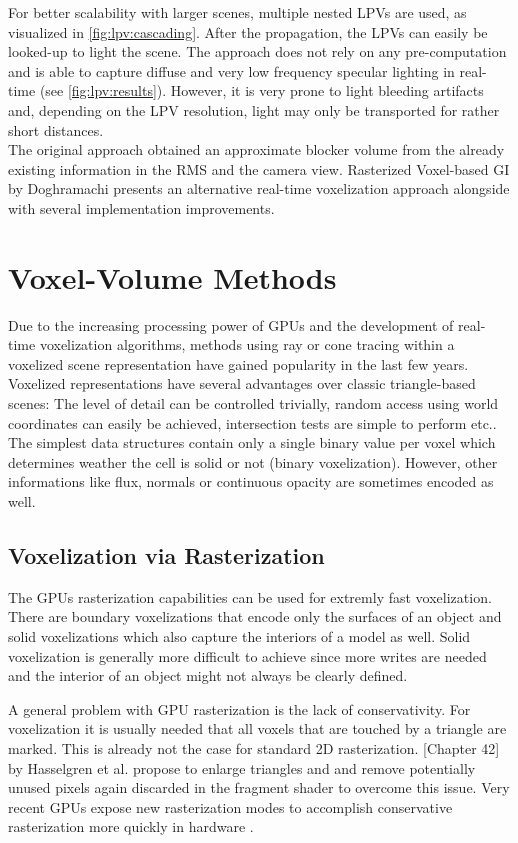 \documentclass[thesis.tex]{subfiles}
\begin{document}
For better scalability with larger scenes, multiple nested LPVs are used, as visualized in \autoref{fig:lpv:cascading}.
After the propagation, the LPVs can easily be looked-up to light the scene.
The approach does not rely on any pre-computation and is able to capture diffuse and very low frequency specular lighting in real-time (see \autoref{fig:lpv:results}).
However, it is very prone to light bleeding artifacts and, depending on the LPV resolution, light may only be transported for rather short distances.
\\
The original approach obtained an approximate blocker volume from the already existing information in the RMS and the camera view.
Rasterized Voxel-based GI by Doghramachi \cite{bib:rasterizedvbgi} presents an alternative real-time voxelization approach alongside with several implementation improvements.

\section{Voxel-Volume Methods} \label{sec:prev:voxelmethods}
Due to the increasing processing power of GPUs and the development of real-time voxelization algorithms, methods using ray or cone tracing within a voxelized scene representation have gained popularity in the last few years.
Voxelized representations have several advantages over classic triangle-based scenes:
The level of detail can be controlled trivially, random access using world coordinates can easily be achieved, intersection tests are simple to perform etc..
The simplest data structures contain only a single binary value per voxel which determines weather the cell is solid or not (binary voxelization).
However, other informations like flux, normals or continuous opacity are sometimes encoded as well.

\subsection{Voxelization via Rasterization}
The GPUs rasterization capabilities can be used for extremly fast voxelization.
There are boundary voxelizations that encode only the surfaces of an object and solid voxelizations which also capture the interiors of a model as well.
Solid voxelization is generally more difficult to achieve since more writes are needed and the interior of an object might not always be clearly defined.

A general problem with GPU rasterization is the lack of conservativity. 
For voxelization it is usually needed that all voxels that are touched by a triangle are marked.
This is already not the case for standard 2D rasterization.
\cite{bib:GPUGems2}[Chapter 42] by Hasselgren et al. propose to enlarge triangles and and remove potentially unused pixels again discarded in the fragment shader to overcome this issue.
Very recent GPUs expose new rasterization modes to accomplish conservative rasterization more quickly in hardware \cite{bib:nvconservativeraster}.
\end{document}
